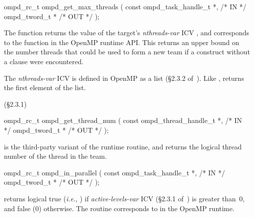 \format
\ccppspecificstart
\begin{boxedcode}
ompd\_rc\_t ompd\_get\_max\_threads (
  const ompd\_task\_handle\_t  *,                           /* IN */
  ompd\_tword\_t              *                                   /* OUT */
); 
\end{boxedcode}
\ccppspecificend

\descr
The  function returns the value of the
target's \emph{nthreads-var} ICV ,
and corresponds to the  function
in the OpenMP runtime API.
This returns an upper bound on the number threads that could be used
to form a new team if a  construct without a
 clause were encountered.

The \emph{nthreads-var} ICV is defined in OpenMP as a list
(\S2.3.2 of~\cite{OpenMP}).
Like , 
returns the first element of the list.

\argdesc

\crossreferences
(\S2.3.1)

\summary

\format
\ccppspecificstart
\begin{boxedcode}
ompd\_rc\_t ompd\_get\_thread\_num (
  const ompd\_thread\_handle\_t *,                       /* IN */
  ompd\_tword\_t *                                 /* OUT */
);
\end{boxedcode}
\ccppspecificend

\descr
{} is the third-party variant of the 
 runtime routine, and returns the logical
thread number of the thread in the team.


\argdesc

\crossreferences


\summary

\format
\ccppspecificstart
\begin{boxedcode}
ompd\_rc\_t ompd\_in\_parallel (
  const ompd\_task\_handle\_t  *,                           /* IN */
  ompd\_tword\_t              *                                   /* OUT */
); 
\end{boxedcode}
\ccppspecificend

\descr
{} returns logical true (\textit{i.e.}, )
if \emph{active-levels-var}
ICV (\S2.3.1 of~\cite{OpenMP}) is greater than~0, and false (0) otherwise.
The routine corresponds to  in the OpenMP runtime.

